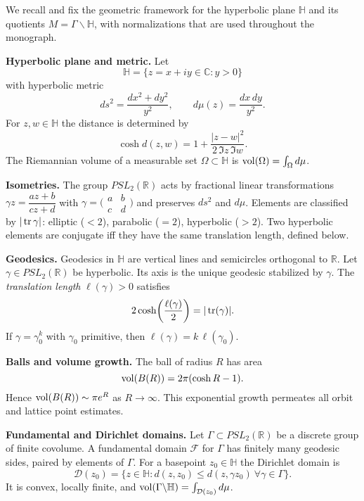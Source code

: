 
\noindent
We recall and fix the geometric framework for the hyperbolic plane $\mathbb{H}$
and its quotients $M=\Gamma\backslash\mathbb{H}$, with normalizations that are used
throughout the monograph.

\medskip

\noindent\textbf{Hyperbolic plane and metric.}
Let
\[
  \mathbb{H}=\{z=x+iy\in\mathbb{C}: y>0\}
\]
with hyperbolic metric
\[
  ds^{2}=\frac{dx^{2}+dy^{2}}{y^{2}}, \qquad
  d\mu(z)=\frac{dx\,dy}{y^{2}}.
\]
For $z,w\in\mathbb{H}$ the distance is determined by
\[
  \cosh d(z,w)=1+\frac{|z-w|^{2}}{2\,\Im z\,\Im w}.
\]
The Riemannian volume of a measurable set $\Omega\subset\mathbb{H}$ is
$\operatorname{vol}(\Omega)=\int_{\Omega} d\mu$.

\medskip

\noindent\textbf{Isometries.}
The group $PSL_{2}(\mathbb{R})$ acts by fractional linear transformations
$\gamma z=\dfrac{az+b}{cz+d}$ with $\gamma=\bigl(\begin{smallmatrix}a&b\\ c&d\end{smallmatrix}\bigr)$
and preserves $ds^{2}$ and $d\mu$.
Elements are classified by $|\operatorname{tr} \gamma|$:
elliptic ($<2$), parabolic ($=2$), hyperbolic ($>2$).
Two hyperbolic elements are conjugate iff they have the same translation length,
defined below.

\medskip

\noindent\textbf{Geodesics.}
Geodesics in $\mathbb{H}$ are vertical lines and semicircles orthogonal to $\mathbb{R}$.
Let $\gamma\in PSL_{2}(\mathbb{R})$ be hyperbolic.
Its axis is the unique geodesic stabilized by $\gamma$.
The \emph{translation length} $\ell(\gamma)>0$ satisfies
\[
  2\cosh\!\left(\frac{\ell(\gamma)}{2}\right)=|\operatorname{tr}(\gamma)|.
\]
If $\gamma=\gamma_{0}^{k}$ with $\gamma_{0}$ primitive, then
$\ell(\gamma)=k\,\ell(\gamma_{0})$.

\medskip

\noindent\textbf{Balls and volume growth.}
The ball of radius $R$ has area
\[
  \operatorname{vol}(B(R))=2\pi(\cosh R-1).
\]
Hence $\operatorname{vol}(B(R))\sim \pi e^{R}$ as $R\to\infty$.
This exponential growth permeates all orbit and lattice point estimates.

\medskip

\noindent\textbf{Fundamental and Dirichlet domains.}
Let $\Gamma\subset PSL_{2}(\mathbb{R})$ be a discrete group of finite covolume.
A fundamental domain $\mathcal{F}$ for $\Gamma$ has finitely many geodesic sides,
paired by elements of $\Gamma$.
For a basepoint $z_{0}\in\mathbb{H}$ the Dirichlet domain is
\[
  \mathcal{D}(z_{0})=\{z\in\mathbb{H}: d(z,z_{0})\le d(z,\gamma z_{0})\ \forall \gamma\in\Gamma\}.
\]
It is convex, locally finite, and $\operatorname{vol}(\Gamma\backslash\mathbb{H})=\int_{\mathcal{D}(z_{0})} d\mu$.

